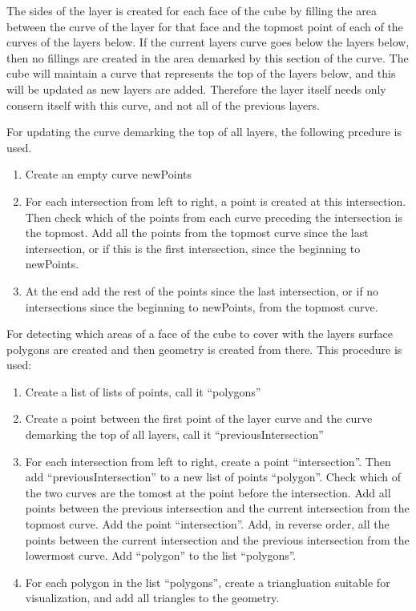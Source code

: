 \documentclass[a4paper,10pt]{article}
\begin{document}
The sides of the layer is created for each face of the cube by filling the area between the curve of the layer for that face and the topmost point of each of the curves of the layers below. If the current layers curve goes below the layers below, then no fillings are created in the area demarked by this section of the curve. The cube will maintain a curve that represents the top of the layers below, and this will be updated as new layers are added. Therefore the layer itself needs only consern itself with this curve, and not all of the previous layers.

For updating the curve demarking the top of all layers, the following prcedure is used. 
\begin{enumerate}
 \item Create an empty curve newPoints
 \item For each intersection from left to right, a point is created at this intersection. Then check which of the points from each curve preceding the intersection is the topmost. Add all the points from the topmost curve since the last intersection, or if this is the first intersection, since the beginning to newPoints.
 \item At the end add the rest of the points since the last intersection, or if no intersections since the beginning to newPoints, from the topmost curve.
\end{enumerate}

For detecting which areas of a face of the cube to cover with the layers surface polygons are created and then geometry is created from there. This procedure is used:
\begin{enumerate}
 \item Create a list of lists of points, call it ``polygons''
 \item Create a point between the first point of the layer curve and the curve demarking the top of all layers, call it ``previousIntersection''
 \item For each intersection from left to right, create a point ``intersection''. Then add ``previousIntersection'' to a new list of points ``polygon''. Check which of the two curves are the tomost at the point before the intersection. Add all points between the previous intersection and the current intersection from the topmost curve. Add the point ``intersection''. Add, in reverse order, all the points between the current intersection and the previous intersection from the lowermost curve. Add ``polygon'' to the list ``polygons''.
 \item For each polygon in the list ``polygons'', create a triangluation suitable for visualization, and add all triangles to the geometry.
\end{enumerate}
\end{document}
